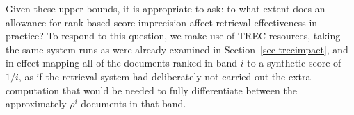 


Given these upper bounds, it is appropriate to ask: to what extent
does an allowance for rank-based score imprecision affect retrieval
effectiveness in practice?
To respond to this question, we make use of TREC resources, taking
the same system runs as were already examined in
Section~\ref{sec-trecimpact}, and in effect mapping all of the
documents ranked in band $i$ to a synthetic score of $1/i$, as if the
retrieval system had deliberately not carried out the extra
computation that would be needed to fully differentiate between the
approximately $\rho^i$ documents in that band.

